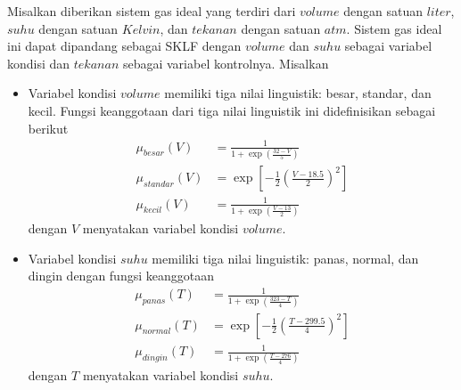 \begin{contoh} \label{contoh inf mamdani}
Misalkan diberikan sistem gas ideal yang terdiri dari $volume$ dengan satuan $liter$, $suhu$ dengan satuan $Kelvin$, dan $tekanan$ dengan satuan $atm$. Sistem gas ideal ini dapat dipandang sebagai SKLF dengan $volume$ dan $suhu$ sebagai variabel kondisi dan $tekanan$ sebagai variabel kontrolnya. Misalkan
\begin{itemize}
    \item Variabel kondisi $volume$ memiliki tiga nilai linguistik: besar, standar, dan kecil. Fungsi keanggotaan dari tiga nilai linguistik ini didefinisikan sebagai berikut
    \begin{align*}
        \mu_{besar}(V) &= \displaystyle\frac{1}{ 1+\exp\left(\displaystyle\frac{32-V}{5} \right) }\\
        \mu_{standar}(V) &= \exp \left[-\displaystyle\frac{1}{2} \left( \displaystyle\frac{V-\num{18,5}}{2} \right)^2 \right]\\
        \mu_{kecil}(V) &= \displaystyle\frac{1}{ 1+\exp\left(\displaystyle\frac{V-13}{2} \right) }
    \end{align*}
    dengan $V$ menyatakan variabel kondisi $volume$. 
    
    \item Variabel kondisi $suhu$ memiliki tiga nilai linguistik: panas, normal, dan dingin dengan fungsi keanggotaan
    \begin{align*}
        \mu_{panas}(T) &= \displaystyle\frac{1}{ 1+\exp\left(\displaystyle\frac{323-T}{4} \right) }\\
        \mu_{normal}(T) &= \exp \left[-\displaystyle\frac{1}{2} \left( \displaystyle\frac{T-\num{299,5}}{4} \right)^2 \right]\\
        \mu_{dingin}(T) &= \displaystyle\frac{1}{ 1+\exp\left(\displaystyle\frac{T-276}{4} \right) }
    \end{align*}
    dengan $T$ menyatakan variabel kondisi $suhu$.
    

\end{itemize}
\end{contoh}
